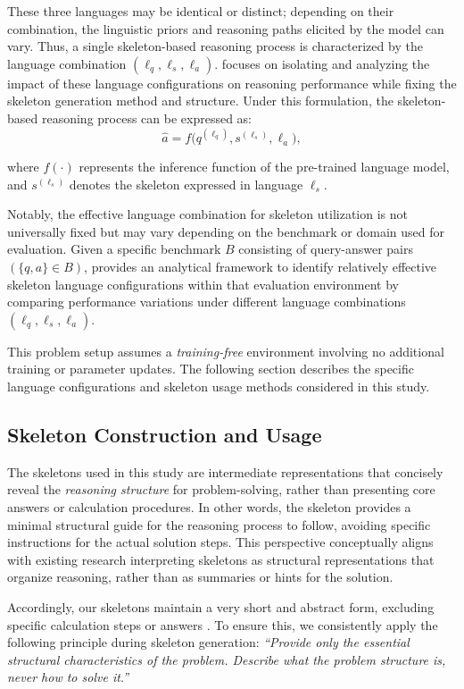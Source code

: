 These three languages may be identical or distinct; depending on their combination, the linguistic priors and reasoning paths elicited by the model can vary. Thus, a single skeleton-based reasoning process is characterized by the language combination $(\ell_q, \ell_s, \ell_a)$. \LASEF focuses on isolating and analyzing the impact of these language configurations on reasoning performance while fixing the skeleton generation method and structure. Under this formulation, the skeleton-based reasoning process can be expressed as:
\[
\hat{a} = f\big(q^{(\ell_q)}, s^{(\ell_s)}, \ell_a\big),
\]

where $f(\cdot)$ represents the inference function of the pre-trained language model, and $s^{(\ell_s)}$ denotes the skeleton expressed in language $\ell_s$.

Notably, the effective language combination for skeleton utilization is not universally fixed but may vary depending on the benchmark or domain used for evaluation. Given a specific benchmark $B$ consisting of query-answer pairs $(\{q,a\} \in B)$, \LASEF provides an analytical framework to identify relatively effective skeleton language configurations within that evaluation environment by comparing performance variations under different language combinations $(\ell_q, \ell_s, \ell_a)$.

This problem setup assumes a \emph{training-free} environment involving no additional training or parameter updates. The following section describes the specific language configurations and skeleton usage methods considered in this study.

\subsection{Skeleton Construction and Usage}

The skeletons used in this study are intermediate representations that concisely reveal the \emph{reasoning structure} for problem-solving, rather than presenting core answers or calculation procedures. In other words, the skeleton provides a minimal structural guide for the reasoning process to follow, avoiding specific instructions for the actual solution steps. This perspective conceptually aligns with existing research interpreting skeletons as structural representations that organize reasoning, rather than as summaries or hints for the solution.

Accordingly, our skeletons maintain a very short and abstract form, excluding specific calculation steps or answers%
. To ensure this, we consistently apply the following principle during skeleton generation: \emph{``Provide only the essential structural characteristics of the problem. Describe what the problem structure is, never how to solve it.''}

